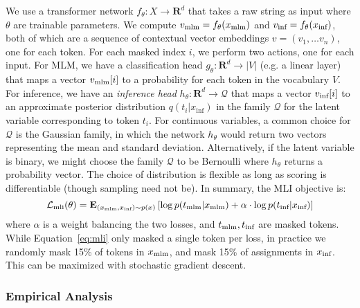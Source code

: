 We use a transformer network $f_\theta: X \rightarrow \mathbf{R}^d$ that takes a raw string as input where $\theta$ are trainable parameters. We compute $v_{\textup{mlm}} = f_\theta(x_{\textup{mlm}})$ and $v_{\textup{inf}} = f_\theta(x_{\textup{inf}})$, both of which are a sequence of contextual vector embeddings $v = (v_1, \ldots v_n)$, one for each token. For each masked index $i$, we perform two actions, one for each input. For MLM, we have a classification head $g_\theta: \mathbf{R}^d \rightarrow |V|$ (e.g. a linear layer) that maps a vector $v_{\textup{mlm}}[i]$ to a probability for each token in the vocabulary $V$. For inference, we have an \textit{inference head} $h_\theta: \mathbf{R}^d \rightarrow \mathcal{Q}$ that maps a vector $v_{\textup{inf}}[i]$ to an approximate posterior distribution $q(t_i|x_{\text{inf}})$ in the family $\mathcal{Q}$ for the latent variable corresponding to token $t_i$.
For continuous variables, a common choice for $\mathcal{Q}$ is the Gaussian family, in which the network $h_\theta$ would return two vectors representing the mean and standard deviation. Alternatively, if the latent variable is binary, we might choose the family $\mathcal{Q}$ to be Bernoulli where $h_\theta$ returns a probability vector. The choice of distribution is flexible as long as scoring is differentiable (though sampling need not be).
In summary, the MLI objective is:
\begin{equation}
\mathcal{L}_{\textup{mli}}(\theta) = \mathbf{E}_{(x_{\textup{mlm}}, x_{\textup{inf}}) \sim p(x)}\left[ \log p(t_{\textup{mlm}} | x_{\textup{mlm}}) + \alpha \cdot \log p(t_{\textup{inf}} | x_{\textup{inf}}) \right]
\label{eq:mli}
\end{equation}
where $\alpha$ is a weight balancing the two losses, and $t_{\textup{mlm}}, t_{\textup{inf}}$ are masked tokens. While Equation~\ref{eq:mli} only masked a single token per loss, in practice we randomly mask 15\% of tokens in $x_{\textup{mlm}}$, and mask 15\% of assignments in $x_{\textup{inf}}$. This can be maximized with stochastic gradient descent.

\subsubsection{Empirical Analysis}
\label{sec:toyexpt}

